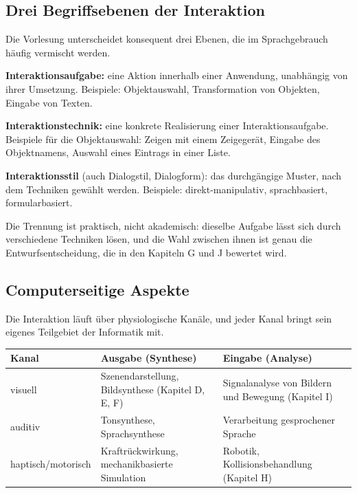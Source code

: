 \documentclass[12pt, a4paper]{article}
\begin{document}
\subsection{Drei Begriffsebenen der Interaktion}

Die Vorlesung unterscheidet konsequent drei Ebenen, die im Sprachgebrauch häufig
vermischt werden.

\begin{definitionbox}
\textbf{Interaktionsaufgabe:} eine Aktion innerhalb einer Anwendung, unabhängig von
ihrer Umsetzung. Beispiele: Objektauswahl, Transformation von Objekten, Eingabe von
Texten.

\textbf{Interaktionstechnik:} eine konkrete Realisierung einer Interaktionsaufgabe.
Beispiele für die Objektauswahl: Zeigen mit einem Zeigegerät, Eingabe des Objektnamens,
Auswahl eines Eintrags in einer Liste.

\textbf{Interaktionsstil} (auch Dialogstil, Dialogform): das durchgängige Muster, nach
dem Techniken gewählt werden. Beispiele: direkt-manipulativ, sprachbasiert,
formularbasiert.
\end{definitionbox}

Die Trennung ist praktisch, nicht akademisch: dieselbe Aufgabe lässt sich durch
verschiedene Techniken lösen, und die Wahl zwischen ihnen ist genau die
Entwurfsentscheidung, die in den Kapiteln G und J bewertet wird.

\subsection{Computerseitige Aspekte}

Die Interaktion läuft über physiologische Kanäle, und jeder Kanal bringt sein eigenes
Teilgebiet der Informatik mit.

\begin{center}
\begin{tabular}{@{}p{2.6cm}p{5.2cm}p{5.2cm}@{}}
\toprule
\textbf{Kanal} & \textbf{Ausgabe (Synthese)} & \textbf{Eingabe (Analyse)} \\
\midrule
visuell & Szenendarstellung, Bildsynthese (Kapitel D, E, F) &
Signalanalyse von Bildern und Bewegung (Kapitel I) \\
auditiv & Tonsynthese, Sprachsynthese & Verarbeitung gesprochener Sprache \\
haptisch/motorisch & Kraftrückwirkung, mechanikbasierte Simulation &
Robotik, Kollisionsbehandlung (Kapitel H) \\
\bottomrule
\end{tabular}
\end{center}
\end{document}
